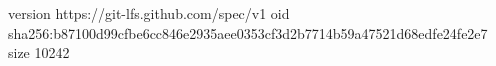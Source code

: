 version https://git-lfs.github.com/spec/v1
oid sha256:b87100d99cfbe6cc846e2935aee0353cf3d2b7714b59a47521d68edfe24fe2e7
size 10242
